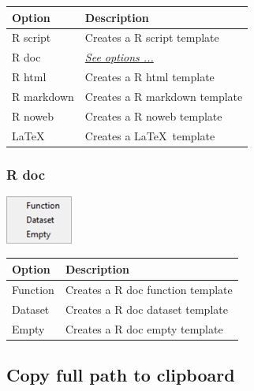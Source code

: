 \begin{scriptsize}
  \begin{tabularx}{\textwidth}{>{\hsize=0.3\hsize}X>{\hsize=0.8\hsize}X}\\
    \hline
    \textbf{Option} & \textbf{Description} \\
    \hline
    R script & Creates a R script template \\
    R doc & \textit{\href{\#menu\_file\_template\_rdoc}{See options ...}} \\
    R html & Creates a R html template \\
    R markdown & Creates a R markdown template \\
    R noweb & Creates a R noweb template \\
    \LaTeX & Creates a \LaTeX ~template \\
    \hline
  \end{tabularx}
\end{scriptsize}


\newpage
\hypertarget{menu_file_template_rdoc}{}
\subsubsection{R doc}

\includegraphics[scale=0.50]{./res/menu_file_template_rdoc.png}\\

\begin{scriptsize}
  \begin{tabularx}{\textwidth}{>{\hsize=0.3\hsize}X>{\hsize=0.8\hsize}X}\\
    \hline
    \textbf{Option} & \textbf{Description} \\
    \hline
    Function & Creates a R doc function template \\
    Dataset & Creates a R doc dataset template  \\
    Empty & Creates a R doc empty template \\
    \hline
  \end{tabularx}
\end{scriptsize}


\hypertarget{menu_file_copyfullpath}{}
\subsection{Copy full path to clipboard}

